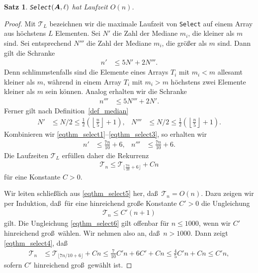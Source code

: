 \documentclass[10pt,reqno]{amsart}
\numberwithin{equation}{section}
\newcommand\cT{\mathcal T}
\newcommand\vA{\vec A}
\def\vec#1{\mathchoice{\mbox{\boldmath$\displaystyle#1$}}
{\mbox{\boldmath$\textstyle#1$}}
{\mbox{\boldmath$\scriptstyle#1$}}
{\mbox{\boldmath$\scriptscriptstyle#1$}}}
\newtheorem{theorem}[definition]{Satz}
\newcommand\bc[1]{\left({#1}\right)}
\begin{document}
\begin{theorem}\label{thm_select}
	{\tt Select}$(\vA,\ell)$ hat Laufzeit $O(n)$.
\end{theorem}
\begin{proof}
	Mit $\cT_L$ bezeichnen wir die maximale Laufzeit von {\tt Select} auf einem Array aus h\"ochstens $L$ Elementen.
	Sei $N'$ die Zahl der Mediane $m_i$, die kleiner als $m$ sind.
	Sei entsprechend $N'''$ die Zahl der Mediane $m_i$, die gr\"o\ss er als $m$ sind.
	Dann gilt die Schranke
	\begin{align}\label{eqthm_select1}
		n'&\leq5N'+2N'''.
	\end{align}
	Denn schlimmstenfalls sind die Elemente eines Arrays $T_i$ mit $m_i<m$ allesamt kleiner als $m$, w\"ahrend in einem Array $T_i$ mit $m_i>m$ h\"ochstens zwei Elemente kleiner als $m$ sein k\"onnen.
	Analog erhalten wir die Schranke
	\begin{align}\label{eqthm_select2}
		n'''&\leq5N'''+2N'.
	\end{align}
	Ferner gilt nach Definition~\ref{def_median}
	\begin{align}\label{eqthm_select3}
		N'&\leq N/2\leq\frac12\bc{\left\lfloor\frac n5\right\rfloor+1},&N'''&\leq N/2\leq\frac12\bc{\left\lfloor\frac n5\right\rfloor+1}.
	\end{align}
	Kombinieren wir \eqref{eqthm_select1}--\eqref{eqthm_select3}, so erhalten wir
	\begin{align}\label{eqthm_select4}
		n'&\leq\frac{7n}{10}+6,&n'''&\leq\frac{7n}{10}+6.
	\end{align}
	Die Laufzeiten $\cT_L$ erf\"ullen daher die Rekurrenz
	\begin{align}\label{eqthm_select5}
		\cT_n\leq\cT_{\lfloor\frac{7n}{10}+6\rfloor}+Cn
	\end{align}
	f\"ur eine Konstante $C>0$.

	Wir leiten schlie\ss lich aus \eqref{eqthm_select5} her, da\ss\ $\cT_n=O(n)$.
	Dazu zeigen wir per Induktion, da\ss\ f\"ur eine hinreichend gro\ss e Konstante $C'>0$ die Ungleichung
	\begin{align}\label{eqthm_select6}
		\cT_n\leq C'(n+1)
	\end{align}
	gilt.
	Die Ungleichung \eqref{eqthm_select6} gilt offenbar f\"ur $n\leq1000$, wenn wir $C'$ hinreichend gro\ss\ w\"ahlen.
	Wir nehmen also an, da\ss\ $n>1000$.
	Dann zeigt \eqref{eqthm_select4}, da\ss
	\begin{align*}
		\cT_n&\leq \cT_{\lfloor 7n/10+6\rfloor}+Cn\leq \frac7{10}C'n+6C'+Cn\leq\frac45C'n+Cn\leq C'n,
	\end{align*}
	sofern $C'$ hinreichend gro\ss\ gew\"ahlt ist.
\end{proof}
\end{document}
